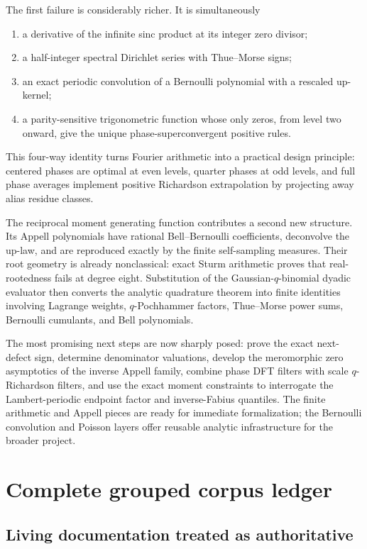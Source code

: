 \documentclass[11pt,oneside]{article}
\numberwithin{equation}{section}
\theoremstyle{definition}
\theoremstyle{remark}
\begin{document}
The first failure is considerably richer.  It is simultaneously
\begin{enumerate}
\item a derivative of the infinite sinc product at its integer zero divisor;
\item a half-integer spectral Dirichlet series with Thue--Morse signs;
\item an exact periodic convolution of a Bernoulli polynomial with a rescaled up-kernel;
\item a parity-sensitive trigonometric function whose only zeros, from level two onward, give the unique phase-superconvergent positive rules.
\end{enumerate}
This four-way identity turns Fourier arithmetic into a practical design principle: centered phases are optimal at even levels, quarter phases at odd levels, and full phase averages implement positive Richardson extrapolation by projecting away alias residue classes.

The reciprocal moment generating function contributes a second new structure.  Its Appell polynomials have rational Bell--Bernoulli coefficients, deconvolve the up-law, and are reproduced exactly by the finite self-sampling measures.  Their root geometry is already nonclassical: exact Sturm arithmetic proves that real-rootedness fails at degree eight.  Substitution of the Gaussian-$q$-binomial dyadic evaluator then converts the analytic quadrature theorem into finite identities involving Lagrange weights, $q$-Pochhammer factors, Thue--Morse power sums, Bernoulli cumulants, and Bell polynomials.

The most promising next steps are now sharply posed: prove the exact next-defect sign, determine denominator valuations, develop the meromorphic zero asymptotics of the inverse Appell family, combine phase DFT filters with scale $q$-Richardson filters, and use the exact moment constraints to interrogate the Lambert-periodic endpoint factor and inverse-Fabius quantiles.  The finite arithmetic and Appell pieces are ready for immediate formalization; the Bernoulli convolution and Poisson layers offer reusable analytic infrastructure for the broader \repoPartl{} project.

\appendix

\section{Complete grouped corpus ledger}
\label{p3:app:corpus}

\subsection{Living documentation treated as authoritative}
\end{document}
